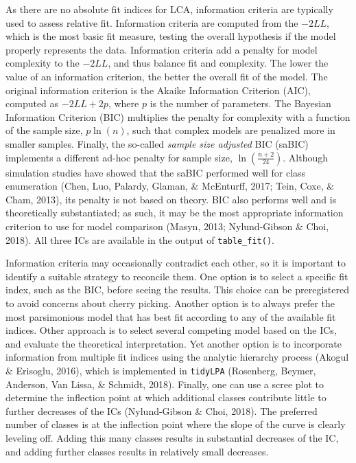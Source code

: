 \documentclass[
  ,man,floatsintext]{apa6}
\begin{document}
As there are no absolute fit indices for LCA,
information criteria are typically used to assess relative fit.
Information criteria are computed from the \(-2LL\),
which is the most basic fit measure, testing the overall hypothesis if the model properly represents the data.
Information criteria add a penalty for model complexity to the \(-2LL\), and thus balance fit and complexity.
The lower
the value of an information criterion, the better the overall fit of the
model.
The original information criterion is the Akaike Information Criterion (AIC),
computed as \(-2LL+2p\), where \(p\) is the number of parameters.
The Bayesian Information Criterion (BIC) multiplies the penalty for complexity with a function of the sample size, \(p \ln(n)\),
such that complex models are penalized more in smaller samples.
Finally,
the so-called \emph{sample size adjusted} BIC (saBIC) implements a different ad-hoc penalty for sample size,
\(\ln(\frac{n + 2}{24})\).
Although simulation studies have showed that the saBIC performed well for class enumeration (Chen, Luo, Palardy, Glaman, \& McEnturff, 2017; Tein, Coxe, \& Cham, 2013),
its penalty is not based on theory.
BIC also performs well and is theoretically substantiated;
as such, it may be the most appropriate information criterion to use for model comparison (Masyn, 2013; Nylund-Gibson \& Choi, 2018).
All three ICs are available in the output of \texttt{table\_fit()}.

Information criteria may occasionally contradict each other, so it is
important to identify a suitable strategy to reconcile them.
One option is to select a specific fit index, such as the BIC,
before seeing the results.
This choice can be preregistered to avoid concerns about cherry picking.
Another option is to always prefer the most parsimonious model that has best fit according to any of the available fit indices. Other approach is to select several competing model based on the ICs, and evaluate the theoretical interpretation.
Yet another option is to incorporate information from multiple fit indices using the analytic hierarchy process (Akogul \& Erisoglu, 2016),
which is implemented in \texttt{tidyLPA} (Rosenberg, Beymer, Anderson, Van Lissa, \& Schmidt, 2018).
Finally, one can use a scree plot to determine the inflection point at which additional classes contribute little to further decreases of the ICs (Nylund-Gibson \& Choi, 2018).
The preferred number of classes is at the inflection point where the slope of the curve is clearly leveling off.
Adding this many classes results in substantial decreases of the IC,
and adding further classes results in relatively small decreases.
\end{document}
